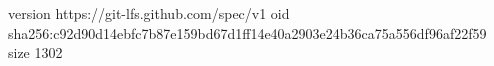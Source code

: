 version https://git-lfs.github.com/spec/v1
oid sha256:c92d90d14ebfc7b87e159bd67d1ff14e40a2903e24b36ca75a556df96af22f59
size 1302
